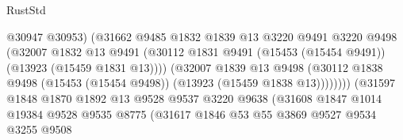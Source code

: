 \begin{lexlean}{RustStd}
\begin{coremodule}
                                          @30947
                                          @30953)
                                        (@31662
                                          @9485
                                          @1832
                                          @1839
                                          @13
                                          @3220
                                          @9491
                                          @3220
                                          @9498
                                          (@32007
                                            @1832
                                            @13
                                            @9491
                                            (@30112
                                              @1831
                                              @9491
                                              (@15453 (@15454 @9491))
                                              (@13923 (@15459 @1831 @13))))
                                          (@32007
                                            @1839
                                            @13
                                            @9498
                                            (@30112
                                              @1838
                                              @9498
                                              (@15453 (@15454 @9498))
                                              (@13923 (@15459 @1838 @13))))))))
                                  (@31597
                                    @1848
                                    @1870
                                    @1892
                                    @13
                                    @9528
                                    @9537
                                    @3220
                                    @9638
                                    (@31608
                                      @1847
                                      @1014
                                      @19384
                                      @9528
                                      @9535
                                      @8775
                                      (@31617
                                        @1846
                                        @53
                                        @55
                                        @3869
                                        @9527
                                        @9534
                                        @3255
                                        @9508

\end{coremodule}
\end{lexlean}
